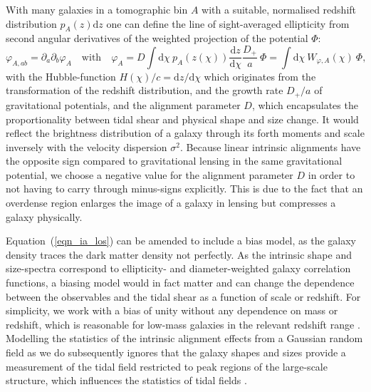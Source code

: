 \documentclass[a4paper,fleqn,usenatbib]{mnras}
\newcommand{\dd}{\mathrm{d}}
\begin{document}
With many galaxies in a tomographic bin $A$ with a suitable, normalised redshift distribution $p_A(z)\dd z$ one can define the line of sight-averaged ellipticity from second angular derivatives of the weighted projection of the potential $\Phi$:
\begin{equation}
\varphi_{A,ab} = \partial_a\partial_b\varphi_A
\quad\mathrm{with}\quad
\varphi_A = D\int\dd\chi\:p_A(z(\chi))\frac{\dd z}{\dd\chi}\frac{D_+}{a}\:\Phi = \int\dd\chi\:W_{\varphi,A}(\chi)\:\Phi,
\label{eqn_ia_los}
\end{equation}
with the Hubble-function $H(\chi)/c = \dd z/\dd\chi$ which originates from the transformation of the redshift distribution, and the growth rate $D_+/a$ of gravitational potentials, and the alignment parameter $D$, which encapsulates the proportionality between tidal shear and physical shape and size change. It would reflect the brightness distribution of a galaxy through its forth moments and scale inversely with the velocity dispersion $\sigma^2$. Because linear intrinsic alignments have the opposite sign compared to gravitational lensing in the same gravitational potential, we choose a negative value for the alignment parameter $D$ in order to not having to carry through minus-signs explicitly. This is due to the fact that an overdense region enlarges the image of a galaxy in lensing but compresses a galaxy physically.

Equation~(\ref{eqn_ia_los}) can be amended to include a bias model, as the galaxy density traces the dark matter density not perfectly. As the intrinsic shape and size-spectra correspond to ellipticity- and diameter-weighted galaxy correlation functions, a biasing model would in fact matter and can change the dependence between the observables and the tidal shear as a function of scale or redshift. For simplicity, we work with a bias of unity without any dependence on mass or redshift, which is reasonable for low-mass galaxies in the relevant redshift range \citep{sheth_large-scale_1999}. Modelling the statistics of the intrinsic alignment effects from a Gaussian random field as we do subsequently ignores that the galaxy shapes and sizes provide a measurement of the tidal field restricted to peak regions of the large-scale structure, which influences the statistics of tidal fields \citep{peacock_statistics_1985, schafer_galactic_2012}.
\end{document}
